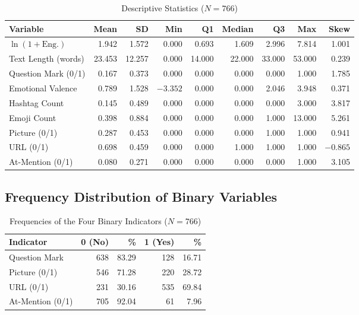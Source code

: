 \documentclass[12pt,a4paper]{article}
\begin{document}
\begin{table}[H]
\centering
\caption{Descriptive Statistics ($N=766$)}
\label{tab:desc_full}
\small
\begin{tabular}{lrrrrrrrr}
\toprule
Variable & Mean & SD & Min & Q1 & Median & Q3 & Max & Skew \\
\midrule
$\ln(1+\text{Eng.})$ & 1.942 & 1.572 & 0.000 & 0.693 & 1.609 & 2.996 & 7.814 & 1.001 \\
Text Length (words) & 23.453 & 12.257 & 0.000 & 14.000 & 22.000 & 33.000 & 53.000 & 0.239 \\
Question Mark (0/1) & 0.167 & 0.373 & 0.000 & 0.000 & 0.000 & 0.000 & 1.000 & 1.785 \\
Emotional Valence & 0.789 & 1.528 & $-3.352$ & 0.000 & 0.000 & 2.046 & 3.948 & 0.371 \\
Hashtag Count & 0.145 & 0.489 & 0.000 & 0.000 & 0.000 & 0.000 & 3.000 & 3.817 \\
Emoji Count & 0.398 & 0.884 & 0.000 & 0.000 & 0.000 & 1.000 & 13.000 & 5.261 \\
Picture (0/1) & 0.287 & 0.453 & 0.000 & 0.000 & 0.000 & 1.000 & 1.000 & 0.941 \\
URL (0/1) & 0.698 & 0.459 & 0.000 & 0.000 & 1.000 & 1.000 & 1.000 & $-0.865$ \\
At-Mention (0/1) & 0.080 & 0.271 & 0.000 & 0.000 & 0.000 & 0.000 & 1.000 & 3.105 \\
\bottomrule
\end{tabular}
\end{table}

\subsection{Frequency Distribution of Binary Variables}

\begin{table}[H]
\centering
\caption{Frequencies of the Four Binary Indicators ($N=766$)}
\small
\begin{tabular}{lrrrr}
\toprule
Indicator & 0 (No) & \% & 1 (Yes) & \% \\
\midrule
Question Mark & 638 & 83.29 & 128 & 16.71 \\
Picture (0/1) & 546 & 71.28 & 220 & 28.72 \\
URL (0/1) & 231 & 30.16 & 535 & 69.84 \\
At-Mention (0/1) & 705 & 92.04 & 61 & 7.96 \\
\bottomrule
\end{tabular}
\end{table}
\end{document}
